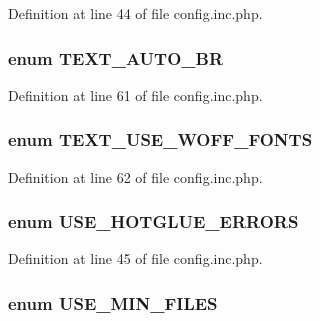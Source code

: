 Definition at line 44 of file config.inc.php.

\hypertarget{config_8inc_8php_a6f581226f389510394c592491ebedc0b}{
\subsubsection[{TEXT\_\-AUTO\_\-BR}]{\setlength{\rightskip}{0pt plus 5cm}enum {\bf TEXT\_\-AUTO\_\-BR}}}
\label{config_8inc_8php_a6f581226f389510394c592491ebedc0b}


Definition at line 61 of file config.inc.php.

\hypertarget{config_8inc_8php_aca83853e44d4952801b133bf687a1056}{
\subsubsection[{TEXT\_\-USE\_\-WOFF\_\-FONTS}]{\setlength{\rightskip}{0pt plus 5cm}enum {\bf TEXT\_\-USE\_\-WOFF\_\-FONTS}}}
\label{config_8inc_8php_aca83853e44d4952801b133bf687a1056}


Definition at line 62 of file config.inc.php.

\hypertarget{config_8inc_8php_a4be2ca4abd0486feb76708f3cf7e671d}{
\subsubsection[{USE\_\-HOTGLUE\_\-ERRORS}]{\setlength{\rightskip}{0pt plus 5cm}enum {\bf USE\_\-HOTGLUE\_\-ERRORS}}}
\label{config_8inc_8php_a4be2ca4abd0486feb76708f3cf7e671d}


Definition at line 45 of file config.inc.php.

\hypertarget{config_8inc_8php_a98806af9de0ea41a958d26c7e06b26a9}{
\subsubsection[{USE\_\-MIN\_\-FILES}]{\setlength{\rightskip}{0pt plus 5cm}enum {\bf USE\_\-MIN\_\-FILES}}}
\label{config_8inc_8php_a98806af9de0ea41a958d26c7e06b26a9}


